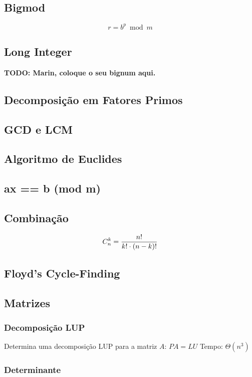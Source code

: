 \documentclass[12pt,a4paper]{article}
\begin{document}
		\subsection{Bigmod}
			\[ r = b^p \bmod m \]
			
		\subsection{Long Integer}
			\textbf{TODO: Marin, coloque o seu bignum aqui.}
		\subsection{Decomposição em Fatores Primos}
			
		\subsection{GCD e LCM}
			
		\subsection{Algoritmo de Euclides}
			
		\subsection{ax == b (mod m)}
			
		\subsection{Combinação}
			\[ C_n^k = {n! \over {k! \cdot (n - k)!}} \]
			
		\subsection{Floyd's Cycle-Finding}
			
		\subsection{Matrizes}
			\subsubsection{Decomposição LUP}
				Determina uma decomposição LUP para a matriz \(A\): \( PA = LU \)
				Tempo: \( \Theta(n^3) \)
				
			\subsubsection{Determinante}
				
\end{document}
